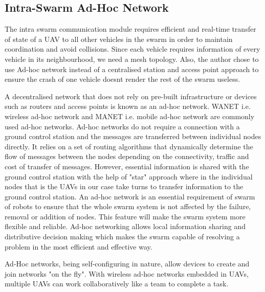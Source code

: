 \begin{spacing}{2}
\subsection{Intra-Swarm Ad-Hoc Network}
The intra swarm communication module requires efficient and real-time transfer of state of a UAV to all other vehicles in the swarm in order to maintain coordination and avoid collisions. Since each vehicle requires information of every vehicle in its neighbourhood, we need a mesh topology. Also, the author chose to use Ad-hoc network instead of a centralised station and access point approach to ensure the crash of one vehicle doesnt render the rest of the swarm useless.


A decentralised network that does not rely on pre-built infrastructure or devices such as routers and access points is known as an ad-hoc network. WANET i.e. wireless ad-hoc network and MANET i.e. mobile ad-hoc network are commonly used ad-hoc networks. Ad-hoc networks do not require a connection with a ground control station and the messages are transferred between individual nodes directly. It relies on a set of routing algorithms that dynamically determine the flow of messages between the nodes depending on the connectivity, traffic and cost of transfer of messages. However, essential information is shared with the ground control station with the help of "star" approach where in the individual nodes that is the UAVs in our case take turns to transfer information to the ground control station. An ad-hoc network is an essential requirement of swarm of robots to ensure that the whole swarm system is not affected by the failure, removal or addition of nodes. This feature will make the swarm system more flexible and reliable. Ad-hoc networking allows local information sharing and distributive decision making which makes the swarm capable of resolving a problem in the most efficient and effective way.

Ad-Hoc networks, being self-configuring in nature, allow devices to create and join networks "on the fly". With wireless ad-hoc networks embedded in UAVs, multiple UAVs can work collaboratively like a team to complete a task.


\end{spacing}
